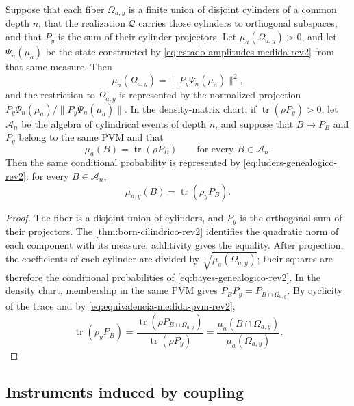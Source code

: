 \begin{theorem}
\label{thm:fibra-proyeccion-medida-rev2}
Suppose that each fiber \(\Omega_{a,y}\) is a finite union of disjoint
cylinders of a common depth \(n\), that the realization
\(\mathcal Q\) carries those cylinders to orthogonal subspaces, and that \(P_y\)
is the sum of their cylinder projectors. Let
\(\mu_a(\Omega_{a,y})>0\), and let \(\Psi_n(\mu_a)\) be the state constructed by
\eqref{eq:estado-amplitudes-medida-rev2} from that same measure. Then
\[
 \mu_a(\Omega_{a,y})=\|P_y\Psi_n(\mu_a)\|^2,
\]
and the restriction to \(\Omega_{a,y}\) is represented by the normalized
projection \(P_y\Psi_n(\mu_a)/\|P_y\Psi_n(\mu_a)\|\). In the density-matrix chart, if
\(\operatorname{tr}(\rho P_y)>0\), let \(\mathcal A_n\) be the algebra of cylindrical events of
depth \(n\), and suppose that \(B\mapsto P_B\) and \(P_y\) belong
to the same PVM and that
\begin{equation}
 \mu_a(B)=\operatorname{tr}(\rho P_B)
 \qquad\text{for every }B\in\mathcal A_n.
 \label{eq:equivalencia-medida-pvm-rev2}
\end{equation}
Then the same conditional probability is represented by
\eqref{eq:luders-genealogico-rev2}: for every \(B\in\mathcal A_n\),
\[
 \mu_{a,y}(B)=\operatorname{tr}(\rho_yP_B).
\]
\end{theorem}

\begin{proof}
The fiber is a disjoint union of cylinders, and \(P_y\) is the orthogonal sum of
their projectors. The \cref{thm:born-cilindrico-rev2} identifies the quadratic
norm of each component with its measure; additivity gives the equality.
After projection, the coefficients of each cylinder are divided by
\(\sqrt{\mu_a(\Omega_{a,y})}\); their squares are therefore the
conditional probabilities of \eqref{eq:bayes-genealogico-rev2}.
In the density chart, membership in the same PVM gives
\(P_BP_y=P_{B\cap\Omega_{a,y}}\). By cyclicity of the trace and by
\eqref{eq:equivalencia-medida-pvm-rev2},
\[
 \operatorname{tr}(\rho_yP_B)
 =\frac{\operatorname{tr}(\rho P_{B\cap\Omega_{a,y}})}
        {\operatorname{tr}(\rho P_y)}
 =\frac{\mu_a(B\cap\Omega_{a,y})}{\mu_a(\Omega_{a,y})}.
\]
\end{proof}

\subsection{Instruments induced by coupling}

